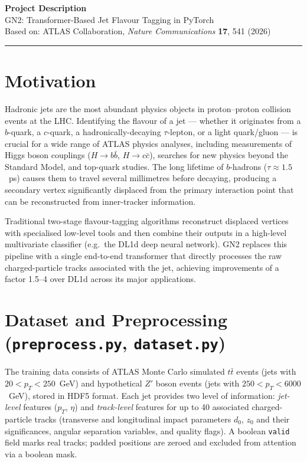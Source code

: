 \documentclass[11pt,a4paper]{article}
\begin{document}
\begin{center}
  {\LARGE\bfseries Project Description}\\[4pt]
  {\large GN2: Transformer-Based Jet Flavour Tagging in PyTorch}\\[2pt]
  {\small\color{gray}
    Based on: ATLAS Collaboration, \textit{Nature Communications} \textbf{17}, 541 (2026)}
\end{center}
\vspace{4pt}\hrule\vspace{10pt}

\section{Motivation}

Hadronic jets are the most abundant physics objects in proton--proton collision
events at the LHC.
Identifying the flavour of a jet --- whether it originates from a $b$-quark,
a $c$-quark, a hadronically-decaying $\tau$-lepton, or a light quark/gluon ---
is crucial for a wide range of ATLAS physics analyses, including measurements
of Higgs boson couplings ($H\to b\bar{b}$, $H\to c\bar{c}$), searches for
new physics beyond the Standard Model, and top-quark studies.
The long lifetime of $b$-hadrons ($\tau\approx 1.5$~ps) causes them to
travel several millimetres before decaying, producing a secondary vertex
significantly displaced from the primary interaction point that can be
reconstructed from inner-tracker information.

Traditional two-stage flavour-tagging algorithms reconstruct displaced
vertices with specialised low-level tools and then combine their outputs in a
high-level multivariate classifier (e.g.\ the DL1d deep neural network).
GN2 replaces this pipeline with a single end-to-end transformer that directly
processes the raw charged-particle tracks associated with the jet, achieving
improvements of a factor 1.5--4 over DL1d across its major applications.

\section{Dataset and Preprocessing (\texttt{preprocess.py}, \texttt{dataset.py})}

The training data consists of ATLAS Monte Carlo simulated $t\bar{t}$ events
(jets with $20 < p_T < 250$~GeV) and hypothetical $Z'$ boson events
(jets with $250 < p_T < 6000$~GeV), stored in HDF5 format.
Each jet provides two level of information:
\textit{jet-level} features ($p_T$, $\eta$) and
\textit{track-level} features for up to 40 associated charged-particle
tracks (transverse and longitudinal impact parameters $d_0$, $z_0$ and their
significances, angular separation variables, and quality flags).
A boolean \texttt{valid} field marks real tracks; padded positions are
zeroed and excluded from attention via a boolean mask.
\end{document}
